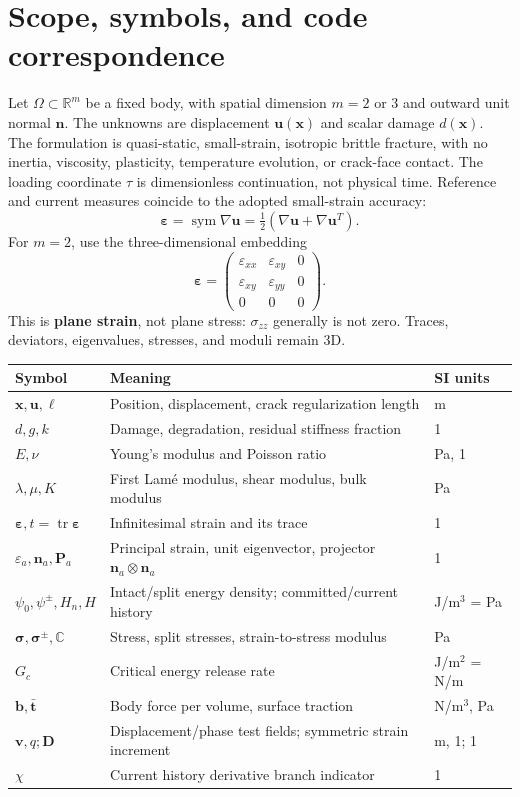 \documentclass[11pt,a4paper]{article}
\newcommand{\eps}{\bm{\varepsilon}}
\newcommand{\sig}{\bm{\sigma}}
\newcommand{\uu}{\bm{u}}
\newcommand{\vv}{\bm{v}}
\newcommand{\D}{\bm{D}}
\newcommand{\C}{\mathbb{C}}
\newcommand{\tr}{\operatorname{tr}}
\newcommand{\sym}{\operatorname{sym}}
\newcommand{\sectionpage}[1]{\clearpage\section{#1}}
\numberwithin{equation}{section}
\begin{document}
\sectionpage{Scope, symbols, and code correspondence}
\label{sec:symbols}
Let $\Omega\subset\mathbb{R}^{m}$ be a fixed body, with spatial dimension
$m=2$ or $3$ and outward unit normal $\bm n$. The unknowns are displacement
$\uu(\bm x)$ and scalar damage $d(\bm x)$. The formulation is quasi-static,
small-strain, isotropic brittle fracture, with no inertia, viscosity, plasticity,
temperature evolution, or crack-face contact. The loading coordinate $\tau$ is
dimensionless continuation, not physical time. Reference and current measures
coincide to the adopted small-strain accuracy:
\begin{equation}
 \eps=\sym\nabla\uu=\tfrac12(\nabla\uu+\nabla\uu^T).
\end{equation}
For $m=2$, use the three-dimensional embedding
\begin{equation}
 \eps=\begin{pmatrix}\varepsilon_{xx}&\varepsilon_{xy}&0\\
 \varepsilon_{xy}&\varepsilon_{yy}&0\\0&0&0\end{pmatrix}.
\end{equation}
This is \textbf{plane strain}, not plane stress: $\sigma_{zz}$ generally is not
zero. Traces, deviators, eigenvalues, stresses, and moduli remain 3D.

\begin{tabular}{@{}p{.20\linewidth}p{.53\linewidth}p{.20\linewidth}@{}}
\toprule Symbol & Meaning & SI units\\\midrule
$\bm x,\uu,\ell$ & Position, displacement, crack regularization length & m\\
$d,g,k$ & Damage, degradation, residual stiffness fraction & 1\\
$E,\nu$ & Young's modulus and Poisson ratio & Pa, 1\\
$\lambda,\mu,K$ & First Lam\'e modulus, shear modulus, bulk modulus & Pa\\
$\eps,t=\tr\eps$ & Infinitesimal strain and its trace & 1\\
$\varepsilon_a,\bm n_a,\bm P_a$ & Principal strain, unit eigenvector, projector $\bm n_a\otimes\bm n_a$ & 1\\
$\psi_0,\psi^\pm,H_n,H$ & Intact/split energy density; committed/current history & J/m$^3$ = Pa\\
$\sig,\sig^\pm,\C$ & Stress, split stresses, strain-to-stress modulus & Pa\\
$G_c$ & Critical energy release rate & J/m$^2$ = N/m\\
$\bm b,\bar{\bm t}$ & Body force per volume, surface traction & N/m$^3$, Pa\\
$\vv,q;\D$ & Displacement/phase test fields; symmetric strain increment & m, 1; 1\\
$\chi$ & Current history derivative branch indicator & 1\\
\bottomrule
\end{tabular}
\end{document}
